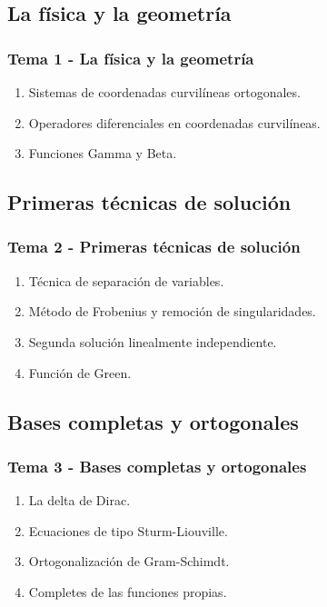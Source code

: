 \documentclass[12pt]{beamer}
\begin{document}
\subsection{La física y la geometría}

\begin{frame}
\frametitle{Tema 1 - La física y la geometría}
\begin{enumerate}[<+->]
\item Sistemas de coordenadas curvilíneas ortogonales.
\item Operadores diferenciales en coordenadas curvilíneas.
\item Funciones Gamma y Beta.
\end{enumerate}
\end{frame}

\subsection{Primeras técnicas de solución}

\begin{frame}
\frametitle{Tema 2 - Primeras técnicas de solución}
\begin{enumerate}[<+->]
\item Técnica de separación de variables.
\item Método de Frobenius y remoción de singularidades.
\item Segunda solución linealmente independiente.
\item Función de Green.
\end{enumerate}
\end{frame}

\subsection{Bases completas y ortogonales}

\begin{frame}
\frametitle{Tema 3 - Bases completas y ortogonales}
\begin{enumerate}[<+->]
\item La delta de Dirac. 
\item Ecuaciones de tipo Sturm-Liouville.
\item Ortogonalización de Gram-Schimdt.
\item Completes de las funciones propias.
\end{enumerate}
\end{frame}
\end{document}
